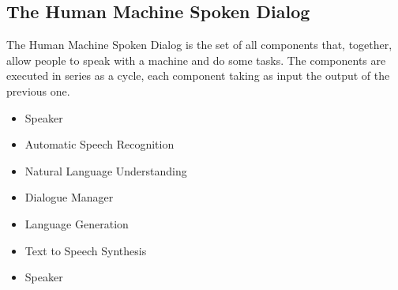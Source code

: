 \documentclass[11pt,a4paper]{article}
\begin{document}
\subsection{The Human Machine Spoken Dialog}

The Human Machine Spoken Dialog is the set of all components that, together, allow people to speak with a machine and do some tasks. The components are executed in series as a cycle, each component taking as input the output of the previous one.

\begin{itemize}
\item Speaker
\item Automatic Speech Recognition
\item Natural Language Understanding
\item Dialogue Manager
\item Language Generation
\item Text to Speech Synthesis
\item Speaker
\end{itemize}
\end{document}
